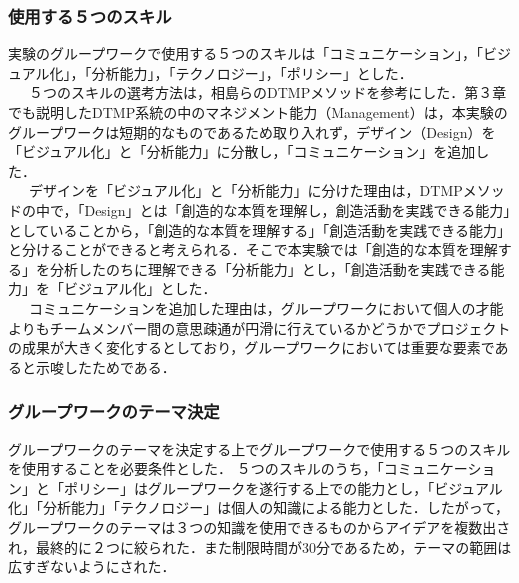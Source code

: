 \documentclass{funthesis}
\begin{document}
\subsubsection{使用する５つのスキル}
実験のグループワークで使用する５つのスキルは「コミュニケーション」，「ビジュアル化」，「分析能力」，「テクノロジー」，「ポリシー」とした．\\
\ \ \ ５つのスキルの選考方法は，相島ら\cite{A5}のDTMPメソッドを参考にした．第３章でも説明したDTMP系統の中のマネジメント能力（Management）は，本実験のグループワークは短期的なものであるため取り入れず，デザイン（Design）を「ビジュアル化」と「分析能力」に分散し，「コミュニケーション」を追加した．\\
\ \ \ デザインを「ビジュアル化」と「分析能力」に分けた理由は，DTMPメソッドの中で，「Design」とは「創造的な本質を理解し，創造活動を実践できる能力」としていることから，「創造的な本質を理解する」「創造活動を実践できる能力」と分けることができると考えられる．そこで本実験では「創造的な本質を理解する」を分析したのちに理解できる「分析能力」とし，「創造活動を実践できる能力」を「ビジュアル化」とした．\\
\ \ \ コミュニケーションを追加した理由は，グループワークにおいて個人の才能よりもチームメンバー間の意思疎通が円滑に行えているかどうかでプロジェクトの成果が大きく変化する\cite{A6}としており，グループワークにおいては重要な要素であると示唆したためである．


\subsubsection{グループワークのテーマ決定}
グループワークのテーマを決定する上でグループワークで使用する５つのスキルを使用することを必要条件とした．
５つのスキルのうち，「コミュニケーション」と「ポリシー」はグループワークを遂行する上での能力とし，「ビジュアル化」「分析能力」「テクノロジー」は個人の知識による能力とした．したがって，グループワークのテーマは３つの知識を使用できるものからアイデアを複数出され，最終的に２つに絞られた．また制限時間が30分であるため，テーマの範囲は広すぎないようにされた．
\end{document}
